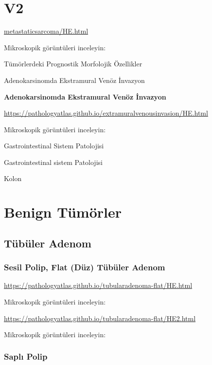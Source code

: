 \documentclass[
  letterpaper,
  DIV=11,
  numbers=noendperiod]{scrreprt}
\begin{document}
\hypertarget{v2}{%
\chapter{V2}\label{v2}}

\href{./metastaticsarcoma/HE.html}{metastaticsarcoma/HE.html}

Mikroskopik görüntüleri inceleyin:

Tümörlerdeki Prognostik Morfolojik Özellikler

Adenokarsinomda Ekstramural Venöz İnvazyon

\textbf{Adenokarsinomda Ekstramural Venöz İnvazyon}

\url{https://pathologyatlas.github.io/extramuralvenousinvasion/HE.html}

Mikroskopik görüntüleri inceleyin:

Gastrointestinal Sistem Patolojisi

Gastrointestinal sistem Patolojisi

Kolon

\hypertarget{benign-tuxfcmuxf6rler-1}{%
\chapter{Benign Tümörler}\label{benign-tuxfcmuxf6rler-1}}

\hypertarget{tuxfcbuxfcler-adenom-1}{%
\section{Tübüler Adenom}\label{tuxfcbuxfcler-adenom-1}}

\hypertarget{sesil-polip-flat-duxfcz-tuxfcbuxfcler-adenom-1}{%
\subsection{Sesil Polip, Flat (Düz) Tübüler
Adenom}\label{sesil-polip-flat-duxfcz-tuxfcbuxfcler-adenom-1}}

\url{https://pathologyatlas.github.io/tubularadenoma-flat/HE.html}

Mikroskopik görüntüleri inceleyin:

\url{https://pathologyatlas.github.io/tubularadenoma-flat/HE2.html}

Mikroskopik görüntüleri inceleyin:

\hypertarget{saplux131-polip-1}{%
\subsection{Saplı Polip}\label{saplux131-polip-1}}
\end{document}
